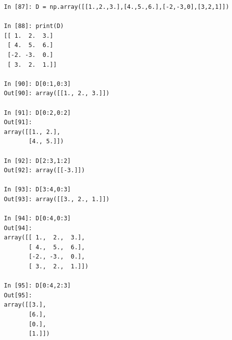 \begin{center}
        \begin{verbatim}
In [87]: D = np.array([[1.,2.,3.],[4.,5.,6.],[-2,-3,0],[3,2,1]])

In [88]: print(D)
[[ 1.  2.  3.]
 [ 4.  5.  6.]
 [-2. -3.  0.]
 [ 3.  2.  1.]]

In [90]: D[0:1,0:3]
Out[90]: array([[1., 2., 3.]])

In [91]: D[0:2,0:2]
Out[91]: 
array([[1., 2.],
       [4., 5.]])

In [92]: D[2:3,1:2]
Out[92]: array([[-3.]])

In [93]: D[3:4,0:3]
Out[93]: array([[3., 2., 1.]])

In [94]: D[0:4,0:3]
Out[94]: 
array([[ 1.,  2.,  3.],
       [ 4.,  5.,  6.],
       [-2., -3.,  0.],
       [ 3.,  2.,  1.]])

In [95]: D[0:4,2:3]
Out[95]: 
array([[3.],
       [6.],
       [0.],
       [1.]])
       \end{verbatim}
\end{center}

